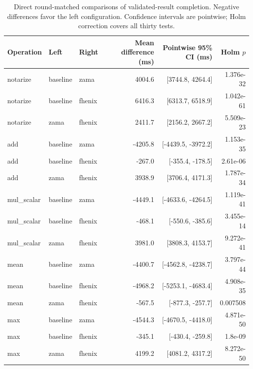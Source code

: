 \begin{table}[!t]
\centering\footnotesize
\caption{Direct round-matched comparisons of validated-result completion. Negative differences favor the left configuration. Confidence intervals are pointwise; Holm correction covers all thirty tests.}
\label{tab:lifecycle-comparisons-transactionToValidatedPlaintextMs}
\begin{tabular}{lllrrr}
\hline
Operation & Left & Right & Mean difference (ms) & Pointwise 95\% CI (ms) & Holm $p$ \\
\hline
notarize & baseline & zama & 4004.6 & [3744.8, 4264.4] & 1.376e-32 \\
notarize & baseline & fhenix & 6416.3 & [6313.7, 6518.9] & 1.042e-61 \\
notarize & zama & fhenix & 2411.7 & [2156.2, 2667.2] & 5.509e-23 \\
add & baseline & zama & -4205.8 & [-4439.5, -3972.2] & 1.153e-35 \\
add & baseline & fhenix & -267.0 & [-355.4, -178.5] & 2.61e-06 \\
add & zama & fhenix & 3938.9 & [3706.4, 4171.3] & 1.787e-34 \\
mul\_scalar & baseline & zama & -4449.1 & [-4633.6, -4264.5] & 1.119e-41 \\
mul\_scalar & baseline & fhenix & -468.1 & [-550.6, -385.6] & 3.455e-14 \\
mul\_scalar & zama & fhenix & 3981.0 & [3808.3, 4153.7] & 9.272e-41 \\
mean & baseline & zama & -4400.7 & [-4562.8, -4238.7] & 3.797e-44 \\
mean & baseline & fhenix & -4968.2 & [-5253.1, -4683.4] & 4.908e-35 \\
mean & zama & fhenix & -567.5 & [-877.3, -257.7] & 0.007508 \\
max & baseline & zama & -4544.3 & [-4670.5, -4418.0] & 4.871e-50 \\
max & baseline & fhenix & -345.1 & [-430.4, -259.8] & 1.8e-09 \\
max & zama & fhenix & 4199.2 & [4081.2, 4317.2] & 8.272e-50 \\
\hline
\end{tabular}
\end{table}

